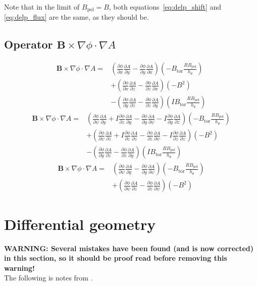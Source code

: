 \documentclass[12pt]{article}
\def\L{\left}
\def\R{\right}
\newcommand{\deriv}[2]{\ensuremath{\frac{\partial #1}{\partial #2}}}
\newcommand{\hthe}{\ensuremath{h_\theta}}
\newcommand{\Bp}{\ensuremath{B_{\text{pol}}}}
\newcommand{\Bt}{\ensuremath{B_{\text{tor}}}}
\newcommand{\ve}[1]{\ensuremath{\boldsymbol{#1}}}
\newcommand{\Bvec}{\ve{B}}
\newcommand{\rbp}{\ensuremath{R\Bp}}
\begin{document}
Note that in the limit of $\Bp = B$, both equations~\ref{eq:delp_shift} and
\ref{eq:delp_flux} are the same, as they should be.



\subsection{Operator \texorpdfstring{$\Bvec\times\nabla\phi\cdot\nabla A$}
%
{B x Nabla Phi Dot Nabla A}}
%
\begin{align*}
\Bvec\times\nabla\phi\cdot\nabla A =& \L(\deriv{\phi}{x}\deriv{A}{y} -
\deriv{\phi}{y}\deriv{A}{x}\R)\L(-\Bt\frac{\rbp}{\hthe}\R) \\ &+
    \L(\deriv{\phi}{x}\deriv{A}{z} -
    \deriv{\phi}{z}\deriv{A}{x}\R)\L(-B^2\R) \\ &-
        \L(\deriv{\phi}{y}\deriv{A}{z} -
        \deriv{\phi}{z}\deriv{A}{y}\R)\L(I\Bt\frac{\rbp}{\hthe}\R)
\end{align*}
%
\begin{align*}
\Bvec\times\nabla\phi\cdot\nabla A =& \L(\deriv{\phi}{\psi}\deriv{A}{y} + I
\deriv{\phi}{z}\deriv{A}{y} - \deriv{\phi}{y}\deriv{A}{\psi} -
I\deriv{\phi}{y}\deriv{A}{z}\R)\L(-\Bt\frac{\rbp}{\hthe}\R) \\ &+
\L(\deriv{\phi}{\psi}\deriv{A}{z} + I\deriv{\phi}{z}\deriv{A}{z} -
\deriv{\phi}{z}\deriv{A}{\psi} -
I\deriv{\phi}{z}\deriv{A}{z}\R)\L(-B^2\R) \\ &-
\L(\deriv{\phi}{y}\deriv{A}{z} -
\deriv{\phi}{z}\deriv{A}{y}\R)\L(I\Bt\frac{\rbp}{\hthe}\R)
\end{align*}
%
\begin{align*}
\Bvec\times\nabla\phi\cdot\nabla A =& \L(\deriv{\phi}{\psi}\deriv{A}{y} -
\deriv{\phi}{y}\deriv{A}{\psi}\R)\L(-\Bt\frac{\rbp}{\hthe}\R)
\nonumber \\ &+ \L(\deriv{\phi}{\psi}\deriv{A}{z} -
\deriv{\phi}{z}\deriv{A}{\psi} \R)\L(-B^2\R)
\end{align*}
%
 

\appendix





\section{Differential geometry}
%
{\color{red} \textbf{WARNING: Several mistakes have been found (and is now
corrected) in this section, so it should be proof read before removing this
warning!}}\\
%
The following is notes from \cite{haeseler-1}.
\end{document}
